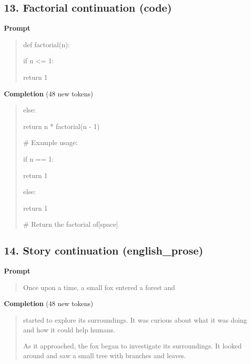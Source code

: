 \documentclass[10pt,a4paper]{article}
\begin{document}
\subsection*{13. Factorial continuation (code)}
\textbf{Prompt}\par
\begin{quote}\small\raggedright \ttfamily def factorial(n):\par\noindent \hspace*{2.0em}if n <= 1:\par\noindent \hspace*{4.0em}return 1\par\noindent [space][space][space][space]\par\end{quote}
\textbf{Completion} (48 new tokens)\par
\begin{quote}\small\raggedright \ttfamily else:\par\noindent \hspace*{4.0em}return n * factorial(n - 1)\par\noindent \mbox{}\par\noindent \# Example usage:\par\noindent if n == 1:\par\noindent \hspace*{2.0em}return 1\par\noindent else:\par\noindent \hspace*{2.0em}return 1\par\noindent \mbox{}\par\noindent \# Return the factorial of[space]\par\end{quote}
\filbreak
\subsection*{14. Story continuation (english\_prose)}
\textbf{Prompt}\par
\begin{quote}\small\raggedright  Once upon a time, a small fox entered a forest and\par\end{quote}
\textbf{Completion} (48 new tokens)\par
\begin{quote}\small\raggedright  \hspace*{0.5em}started to explore its surroundings. It was curious about what it was doing and how it could help humans.\par\noindent \mbox{}\par\noindent As it approached, the fox began to investigate its surroundings. It looked around and saw a small tree with branches and leaves.\par\end{quote}
\filbreak
\end{document}
